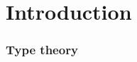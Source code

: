 \chapter*{Introduction}
\label{cha:introduction}


{%


\newcommand{\UU}{{\mathcal U}}
\newcommand{\idtypevar}{{{\sf Id}}}
\newcommand{\eq}{{{\sf Eq}}}



%
%
%
%
%
%
%
%



\subsection*{Type theory}

}
